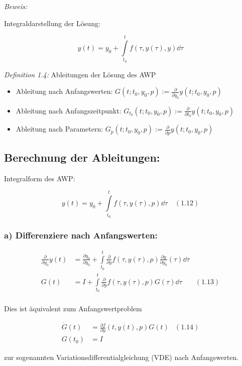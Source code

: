 \emph{Beweis:}

Integraldarstellung der Lösung:

\[ y(t) = y_0 + \int\limits_{t_0}^t f(\tau, y(\tau), y) \dd \tau \]

\emph{Definition 1.4:} Ableitungen der Lösung des AWP

\begin{itemize}
\item Ableitung nach Anfangswerten: $G(t; t_0, y_0, p) := \tfrac{\partial}{\partial y_0} y(t; t_0, y_0, p)$
\item Ableitung nach Anfangszeitpunkt: $G_{t_0}(t; t_0, y_0, p) := \frac{\partial}{\partial t_0} y(t; t_0, y_0, p)$
\item Ableitung nach Parametern: $G_p(t; t_0, y_0, p) := \frac{\partial}{\partial p} y(t; t_0, y_0, p)$
\end{itemize}

\subsection*{Berechnung der Ableitungen:}

Integralform des AWP:

\[y(t) = y_0 + \int\limits_{t_0}^t f(\tau, y(\tau), p) \dd \tau \quad (1.12) \]

\subsubsection*{a) Differenziere nach Anfangswerten:}

\begin{align*}
\frac{\partial}{\partial y_0} y(t) &= \frac{\partial y_0}{\partial y_0} + \int\limits_{t_0}^t \frac{\partial}{\partial y} f(\tau, y(\tau), p) \frac{\partial y}{\partial y_0} (\tau) \dd \tau \\
G(t) &= I + \int\limits_{t_0}^t \frac{\partial}{\partial y} f(\tau, y(\tau), p) G(\tau) \dd \tau & (1.13)\\
\end{align*}

Dies ist äquivalent zum Anfangswertproblem

\begin{align*}
\dot G(t) &= \frac{\partial f}{\partial y} (t, y(t), p) G(t) & (1.14)\\
G(t_0) &= I
\end{align*}

zur sogenannten Variationsdifferentialgleichung (VDE) nach Anfangswerten.

